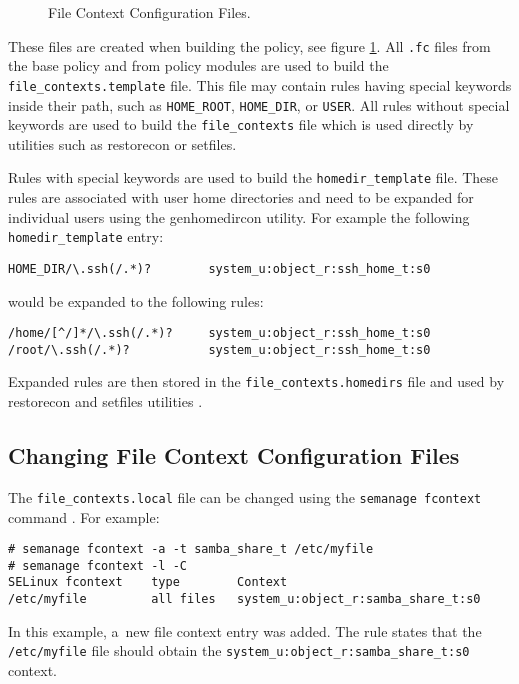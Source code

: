 \begin{figure}
    \centering
    \label{fig:filecontexts}
    
    \caption{File Context Configuration Files.}
\end{figure}

These files are created when building the policy, see figure
\ref{fig:filecontexts}. All \texttt{.fc} files from the base policy and from
policy modules are used to build the \texttt{file\_contexts.template} file. This
file may contain rules having special keywords inside their path, such as
\texttt{HOME\_ROOT}, \texttt{HOME\_DIR}, or \texttt{USER}. All rules without
special keywords are used to build the \texttt{file\_contexts} file which is
used directly by utilities such as restorecon or setfiles.

Rules with special keywords are used to build the \texttt{homedir\_template}
file. These rules are associated with user home directories and need to be
expanded for individual users using the genhomedircon utility. For example the
following \texttt{homedir\_template} entry:
\begin{lstlisting}
HOME_DIR/\.ssh(/.*)?        system_u:object_r:ssh_home_t:s0
\end{lstlisting}
would be expanded to the following rules:
\begin{lstlisting}
/home/[^/]*/\.ssh(/.*)?     system_u:object_r:ssh_home_t:s0
/root/\.ssh(/.*)?           system_u:object_r:ssh_home_t:s0
\end{lstlisting}
Expanded rules are then stored in the \texttt{file\_contexts.homedirs} file and
used by restorecon and setfiles utilities \cite[pp.~134--140]{tsn}.

\subsection{Changing File Context Configuration Files}
The \texttt{file\_contexts.local} file can be changed using the \texttt{semanage
fcontext} command \cite{selinuxguide}. For example:
\begin{lstlisting}
# semanage fcontext -a -t samba_share_t /etc/myfile
# semanage fcontext -l -C
SELinux fcontext    type        Context
/etc/myfile         all files   system_u:object_r:samba_share_t:s0
\end{lstlisting}
In this example, a~new file context entry was added. The rule states that the
\texttt{/etc/myfile} file should obtain the
\texttt{system\_u:object\_r:samba\_share\_t:s0} context.

